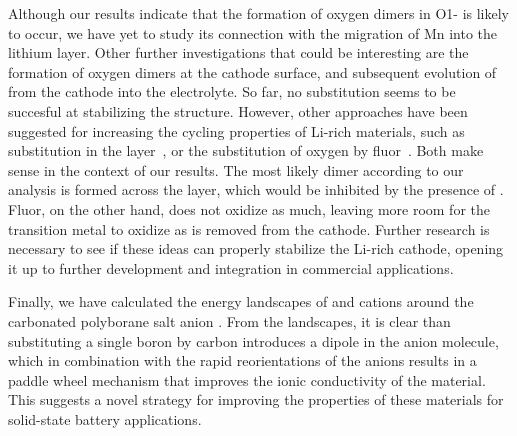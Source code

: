 \begin{refsection}
Although our results indicate that the formation of oxygen dimers in 
O1- is likely to occur, we have yet to study its connection 
with the migration of Mn into the lithium layer. Other further investigations 
that could be interesting are the formation of oxygen dimers at the cathode 
surface, and subsequent evolution of  from the cathode into the 
electrolyte. So far, no substitution seems to be succesful at stabilizing 
the structure. However, other approaches have been suggested for 
increasing the cycling properties of Li-rich materials, such as  
substitution in the  layer~\cite{Yang2017}, or the substitution of 
oxygen by fluor~\cite{Richards2017, Kapylou2017}. Both make sense in the context of 
our results. The most likely dimer according to our analysis is formed 
across the  layer, which would be inhibited by the presence of . 
Fluor, on the other hand, does not oxidize  as much, leaving more 
room for the transition metal to oxidize as  is removed from the 
cathode. Further research is necessary to see if these ideas can properly 
stabilize the Li-rich cathode, opening it up to further development and 
integration in commercial applications.

Finally, we have calculated the energy landscapes of  and  
cations around the carbonated polyborane salt anion \ce{[CB11H12]^{-}}. From 
the landscapes, it is clear than substituting a single boron by carbon introduces 
a dipole in the anion molecule, which in combination with the rapid reorientations 
of the anions results in a paddle wheel mechanism that improves the ionic 
conductivity of the material. This suggests a novel strategy for improving 
the properties of these materials for solid-state battery applications.
 
\printbibliography

\end{refsection} 
